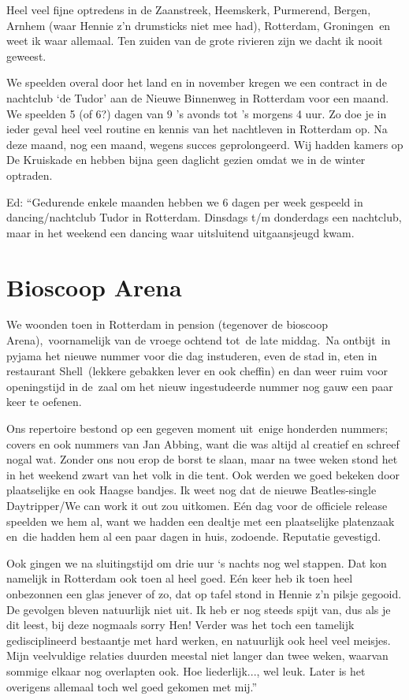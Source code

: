\documentclass[10pt,twoside,openright]{memoir}
\begin{document}
Heel veel fijne optredens in de Zaanstreek, Heemskerk, Purmerend, Bergen, Arnhem (waar Hennie z'n drumsticks niet mee had), Rotterdam, Groningen en weet ik waar allemaal. Ten zuiden van de grote rivieren zijn we dacht ik nooit geweest. 

We speelden overal door het land en in november kregen we een contract in de nachtclub ‘de Tudor’ aan de Nieuwe Binnenweg in Rotterdam voor een maand. We speelden 5 (of 6?) dagen van 9 ’s avonds tot ’s morgens 4 uur. Zo doe je in ieder geval heel veel routine en kennis van het nachtleven in Rotterdam op. Na deze maand, nog een maand, wegens succes geprolongeerd. Wij hadden kamers op De Kruiskade en hebben bijna geen daglicht gezien omdat we in de winter optraden. 

Ed: “Gedurende enkele maanden hebben we 6 dagen per week gespeeld in dancing/nachtclub Tudor in Rotterdam. Dinsdags t/m donderdags een nachtclub, maar in het weekend een dancing waar uitsluitend uitgaansjeugd kwam. 

\chapter{Bioscoop Arena} %
\label{cha:arena}

We woonden toen in Rotterdam in pension (tegenover de bioscoop Arena), voornamelijk van de vroege ochtend tot de late middag. Na ontbijt in pyjama het nieuwe nummer voor die dag instuderen, even de stad in, eten in restaurant Shell (lekkere gebakken lever en ook cheffin) en dan weer ruim voor openingstijd in de zaal om het nieuw ingestudeerde nummer nog gauw een paar keer te oefenen. 

Ons repertoire bestond op een gegeven moment uit enige honderden nummers; covers en ook nummers van Jan Abbing, want die was altijd al creatief en schreef nogal wat. Zonder ons nou erop de borst te slaan, maar na twee weken stond het in het weekend zwart van het volk in die tent. Ook werden we goed bekeken door plaatselijke en ook Haagse bandjes. Ik weet nog dat de nieuwe Beatles-single Daytripper/We can work it out zou uitkomen. Eén dag voor de officiele release speelden we hem al, want we hadden een dealtje met een plaatselijke platenzaak en die hadden hem al een paar dagen in huis, zodoende. Reputatie gevestigd. 

Ook gingen we na sluitingstijd om drie uur `s nachts nog wel stappen. Dat kon namelijk in Rotterdam ook toen al heel goed. Eén keer heb ik toen heel onbezonnen een glas jenever of zo, dat op tafel stond in Hennie z'n pilsje gegooid. De gevolgen bleven natuurlijk niet uit. Ik heb er nog steeds spijt van, dus als je dit leest, bij deze nogmaals sorry Hen! Verder was het toch een tamelijk gedisciplineerd bestaantje met hard werken, en natuurlijk ook heel veel meisjes. Mijn veelvuldige relaties duurden meestal niet langer dan twee weken, waarvan sommige elkaar nog overlapten ook. Hoe liederlijk..., wel leuk. Later is het overigens allemaal toch wel goed gekomen met mij.”
\end{document}
